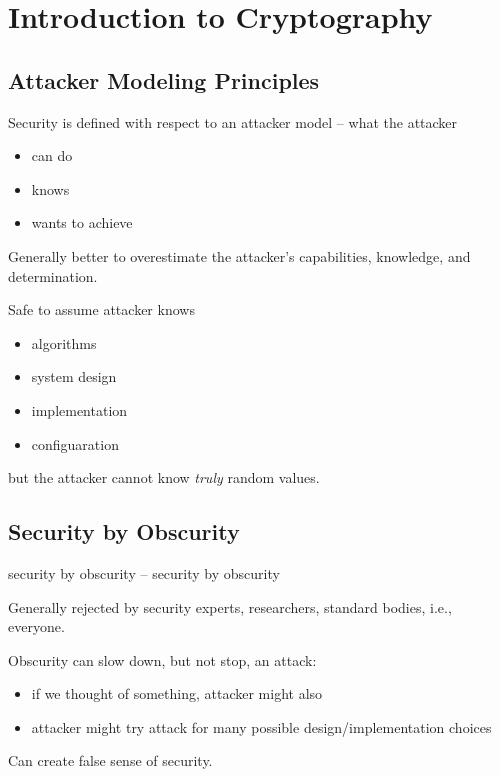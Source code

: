 \documentclass[draft]{article}
\begin{document}
\section{Introduction to Cryptography}
\subsection{Attacker Modeling Principles}
\begin{multicols}{2}
    Security is defined with respect to an \gls{attacker model} -- what the attacker
    \begin{itemize}[nosep]
        \item can do
        \item knows
        \item wants to achieve
    \end{itemize}

    Generally better to overestimate the attacker's capabilities, knowledge, and determination.

    Safe to assume attacker knows
    \begin{itemize}[nosep]
        \item algorithms
        \item system design
        \item implementation
        \item configuaration
    \end{itemize}
    but the attacker cannot know \emph{truly} random values.
\end{multicols}
\subsection{Security by Obscurity}
\Gls{security by obscurity} -- \glsdesc*{security by obscurity}

Generally rejected by security experts, researchers, standard bodies, i.e., everyone.

Obscurity can slow down, but not stop, an attack:
\begin{itemize}[nosep]
    \item if we thought of something, attacker might also
    \item attacker might try attack for many possible design/implementation choices
\end{itemize}
Can create false sense of security.
\end{document}
